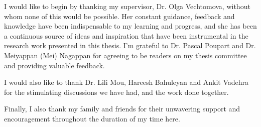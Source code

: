 I would like to begin by thanking my supervisor, Dr. Olga Vechtomova, without whom none of this would be possible. Her constant guidance, feedback and knowledge have been indispensable to my learning and progress, and she has been a continuous source of ideas and inspiration that have been instrumental in the research work presented in this thesis. I'm grateful to Dr. Pascal Poupart and Dr. Meiyappan (Mei) Nagappan for agreeing to be readers on my thesis committee and providing valuable feedback.

I would also like to thank Dr. Lili Mou, Hareesh Bahuleyan and Ankit Vadehra for the stimulating discussions we have had, and the work done together.

Finally, I also thank my family and friends for their unwavering support and encouragement throughout the duration of my time here.
